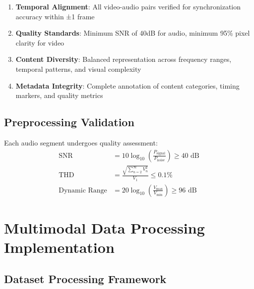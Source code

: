 \begin{enumerate}
    \item \textbf{Temporal Alignment}: All video-audio pairs verified for synchronization accuracy within ±1 frame
    \item \textbf{Quality Standards}: Minimum SNR of 40dB for audio, minimum 95\% pixel clarity for video
    \item \textbf{Content Diversity}: Balanced representation across frequency ranges, temporal patterns, and visual complexity
    \item \textbf{Metadata Integrity}: Complete annotation of content categories, timing markers, and quality metrics
\end{enumerate}

\subsection{Preprocessing Validation}

\begin{definition}
Each audio segment undergoes quality assessment:
\begin{align}
\text{SNR} &= 10 \log_{10}\left(\frac{P_{\text{signal}}}{P_{\text{noise}}}\right) \geq 40 \text{ dB} \\
\text{THD} &= \frac{\sqrt{\sum_{n=2}^{\infty} V_n^2}}{V_1} \leq 0.1\% \\
\text{Dynamic Range} &= 20 \log_{10}\left(\frac{V_{\text{max}}}{V_{\text{min}}}\right) \geq 96 \text{ dB}
\end{align}
\end{definition}

\section{Multimodal Data Processing Implementation}

\subsection{Dataset Processing Framework}

